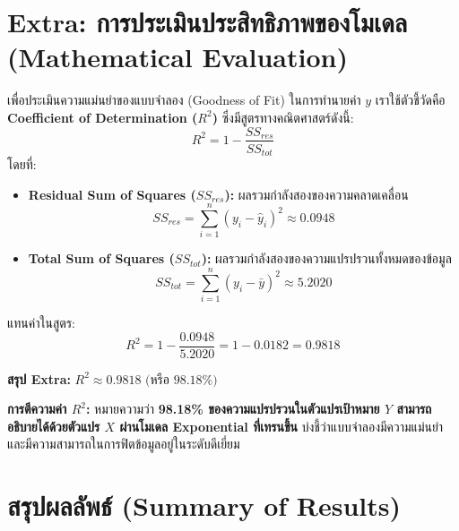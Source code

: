 \documentclass[12pt,a4paper]{article}
\begin{document}
\section*{Extra: การประเมินประสิทธิภาพของโมเดล\\ \large(Mathematical Evaluation)}

เพื่อประเมินความแม่นยำของแบบจำลอง (Goodness of Fit) ในการทำนายค่า $y$ เราใช้ตัวชี้วัดคือ \textbf{Coefficient of Determination ($R^2$)} ซึ่งมีสูตรทางคณิตศาสตร์ดังนี้:
\[
  R^2 = 1 - \frac{SS_{res}}{SS_{tot}}
\]
โดยที่:
\begin{itemize}[noitemsep, topsep=2pt]
  \item \textbf{Residual Sum of Squares ($SS_{res}$):} ผลรวมกำลังสองของความคลาดเคลื่อน
  \[ SS_{res} = \sum_{i=1}^{n} \left( y_i - \hat{y}_i \right)^2 \approx 0.0948 \]
  \item \textbf{Total Sum of Squares ($SS_{tot}$):} ผลรวมกำลังสองของความแปรปรวนทั้งหมดของข้อมูล
  \[ SS_{tot} = \sum_{i=1}^{n} \left( y_i - \bar{y} \right)^2 \approx 5.2020 \]
\end{itemize}

แทนค่าในสูตร:
\[
  R^2 = 1 - \frac{0.0948}{5.2020} = 1 - 0.0182 = 0.9818
\]

\begin{ansbox}
\textbf{สรุป Extra:} \quad $\boxed{R^2 \approx 0.9818 \text{ (หรือ } 98.18\%)}$

\textbf{การตีความค่า $R^2$:} หมายความว่า \textbf{98.18\% ของความแปรปรวนในตัวแปรเป้าหมาย $Y$ สามารถอธิบายได้ด้วยตัวแปร $X$ ผ่านโมเดล Exponential ที่เทรนขึ้น} บ่งชี้ว่าแบบจำลองมีความแม่นยำและมีความสามารถในการฟิตข้อมูลอยู่ในระดับดีเยี่ยม
\end{ansbox}

\section*{สรุปผลลัพธ์ (Summary of Results)}
\end{document}

